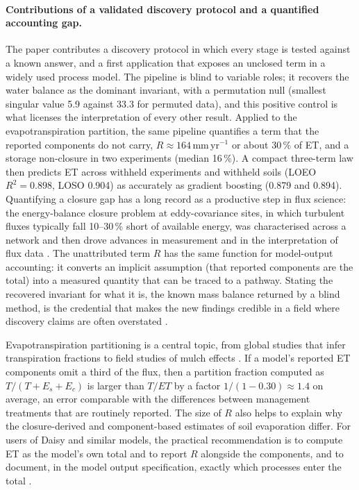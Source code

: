 \documentclass[preprint,12pt,authoryear]{elsarticle}
\begin{document}
\paragraph{Contributions of a validated discovery protocol and a quantified accounting gap.}
The paper contributes a discovery protocol in which every stage is tested against a known answer, and a first application that exposes an unclosed term in a widely used process model. The pipeline is blind to variable roles; it recovers the water balance as the dominant invariant, with a permutation null (smallest singular value 5.9 against 33.3 for permuted data), and this positive control is what licenses the interpretation of every other result. Applied to the evapotranspiration partition, the same pipeline quantifies a term that the reported components do not carry, $R\approx164$\,mm\,yr$^{-1}$ or about 30\,\% of ET, and a storage non-closure in two experiments (median 16\,\%). A compact three-term law then predicts ET across withheld experiments and withheld soils (LOEO $R^2=0.898$, LOSO 0.904) as accurately as gradient boosting (0.879 and 0.894). Quantifying a closure gap has a long record as a productive step in flux science: the energy-balance closure problem at eddy-covariance sites, in which turbulent fluxes typically fall 10--30\,\% short of available energy, was characterised across a network and then drove advances in measurement and in the interpretation of flux data \citep{Wilson2002,Foken2008}. The unattributed term $R$ has the same function for model-output accounting: it converts an implicit assumption (that reported components are the total) into a measured quantity that can be traced to a pathway. Stating the recovered invariant for what it is, the known mass balance returned by a blind method, is the credential that makes the new findings credible in a field where discovery claims are often overstated \citep{Rudin2019,Nearing2021}.

Evapotranspiration partitioning is a central topic, from global studies that infer transpiration fractions \citep{Jasechko2013,Schlesinger2014} to field studies of mulch effects \citep{BalwinderSingh2011}. If a model's reported ET components omit a third of the flux, then a partition fraction computed as $T/(T+E_s+E_c)$ is larger than $T/\mathit{ET}$ by a factor $1/(1-0.30)\approx1.4$ on average, an error comparable with the differences between management treatments that are routinely reported. The size of $R$ also helps to explain why the closure-derived and component-based estimates of soil evaporation differ. For users of Daisy and similar models, the practical recommendation is to compute ET as the model's own total and to report $R$ alongside the components, and to document, in the model output specification, exactly which processes enter the total \citep{Holbak2026}.
\end{document}
